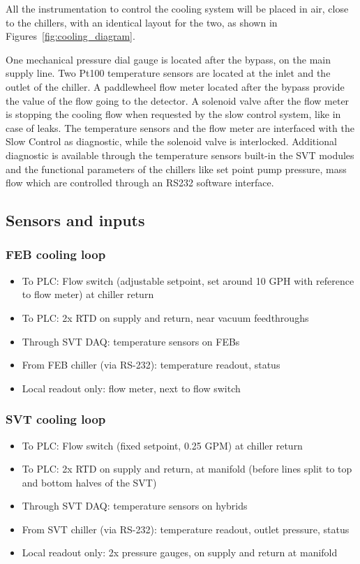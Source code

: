 \documentclass[12pt]{report}
\begin{document}
All the instrumentation to control the cooling system will be placed in air, close to the chillers, with an identical layout for the two, as shown in Figures~\ref{fig:cooling_diagram}. 


One mechanical pressure dial gauge is located after the bypass, on the main supply line. Two Pt100 temperature sensors are located at the inlet and the outlet of the chiller. A paddlewheel flow meter located after the bypass provide the value of the flow going to the detector. A solenoid valve after the flow meter is stopping the cooling flow when requested by the slow control system, like in case of leaks. The temperature sensors and the flow meter are interfaced with the Slow Control as diagnostic, while the solenoid valve is interlocked. Additional diagnostic is available through the temperature sensors built-in the SVT modules and the functional parameters of the chillers like set point pump pressure, mass flow which are controlled through an RS232 software interface.



\subsection{Sensors and inputs}
\subsubsection*{FEB cooling loop}
\begin{itemize}
    \item To PLC: Flow switch (adjustable setpoint, set around 10 GPH with reference to flow meter) at chiller return
    \item To PLC: 2x RTD on supply and return, near vacuum feedthroughs
    \item Through SVT DAQ: temperature sensors on FEBs
    \item From FEB chiller (via RS-232): temperature readout, status
    \item Local readout only: flow meter, next to flow switch
\end{itemize}
\subsubsection*{SVT cooling loop}
\begin{itemize}
    \item To PLC: Flow switch (fixed setpoint, 0.25 GPM) at chiller return
    \item To PLC: 2x RTD on supply and return, at manifold (before lines split to top and bottom halves of the SVT)
    \item Through SVT DAQ: temperature sensors on hybrids
    \item From SVT chiller (via RS-232): temperature readout, outlet pressure, status
    \item Local readout only: 2x pressure gauges, on supply and return at manifold
\end{itemize}
\end{document}
